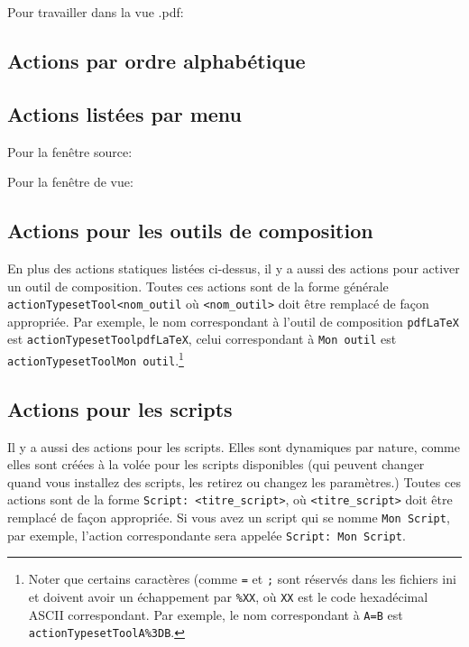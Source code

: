 Pour travailler dans la vue .pdf:


\subsection{Actions par ordre alphabétique}


\subsection{Actions listées par menu}

Pour la fenêtre source:


\bigskip
Pour la fenêtre de vue:


\subsection{Actions pour les outils de composition}
En plus des actions statiques listées ci-dessus, il y a aussi des actions pour activer un outil de composition. Toutes ces actions sont de la forme générale \verb*|actionTypesetTool<nom_outil| où \verb*|<nom_outil>| doit être remplacé de façon appropriée. Par exemple, le nom correspondant à l'outil de composition \verb*|pdfLaTeX| est \verb*|actionTypesetToolpdfLaTeX|, celui correspondant à \verb*|Mon outil| est \verb*|actionTypesetToolMon outil|.\footnote{Noter que certains caractères (comme \verb*|=| et \verb*|;| sont réservés dans les fichiers ini et doivent avoir un échappement par \verb*|%XX|, où \verb*|XX| est le code hexadécimal ASCII correspondant. Par exemple, le nom correspondant à \verb*|A=B| est \verb*|actionTypesetToolA%3DB|.}

\subsection{Actions pour les scripts}
Il y a aussi des actions pour les scripts. Elles sont dynamiques par nature, comme elles sont créées à la volée pour les scripts disponibles (qui peuvent changer quand vous installez des scripts, les retirez ou changez les paramètres.) Toutes ces actions sont de la forme \verb*|Script: <titre_script>|, où \verb*|<titre_script>| doit être remplacé de façon appropriée. Si vous avez un script qui se nomme \verb|Mon Script|, par exemple, l'action correspondante sera appelée \verb*|Script: Mon Script|.


